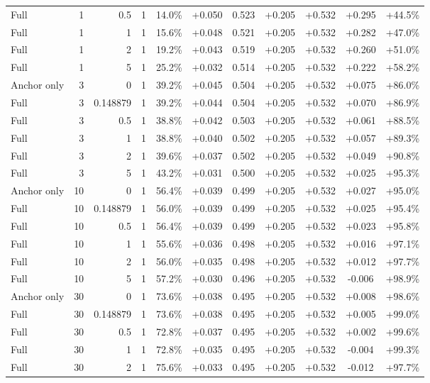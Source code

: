 \begin{table}[htbp]
\begin{tabular}{lrrrccccccc}
Full & 1 & 0.5 & 1 & 14.0\% & +0.050 & 0.523 & +0.205 & +0.532 & +0.295 & +44.5\% \\
Full & 1 & 1 & 1 & 15.6\% & +0.048 & 0.521 & +0.205 & +0.532 & +0.282 & +47.0\% \\
Full & 1 & 2 & 1 & 19.2\% & +0.043 & 0.519 & +0.205 & +0.532 & +0.260 & +51.0\% \\
Full & 1 & 5 & 1 & 25.2\% & +0.032 & 0.514 & +0.205 & +0.532 & +0.222 & +58.2\% \\
Anchor only & 3 & 0 & 1 & 39.2\% & +0.045 & 0.504 & +0.205 & +0.532 & +0.075 & +86.0\% \\
Full & 3 & 0.148879 & 1 & 39.2\% & +0.044 & 0.504 & +0.205 & +0.532 & +0.070 & +86.9\% \\
Full & 3 & 0.5 & 1 & 38.8\% & +0.042 & 0.503 & +0.205 & +0.532 & +0.061 & +88.5\% \\
Full & 3 & 1 & 1 & 38.8\% & +0.040 & 0.502 & +0.205 & +0.532 & +0.057 & +89.3\% \\
Full & 3 & 2 & 1 & 39.6\% & +0.037 & 0.502 & +0.205 & +0.532 & +0.049 & +90.8\% \\
Full & 3 & 5 & 1 & 43.2\% & +0.031 & 0.500 & +0.205 & +0.532 & +0.025 & +95.3\% \\
Anchor only & 10 & 0 & 1 & 56.4\% & +0.039 & 0.499 & +0.205 & +0.532 & +0.027 & +95.0\% \\
Full & 10 & 0.148879 & 1 & 56.0\% & +0.039 & 0.499 & +0.205 & +0.532 & +0.025 & +95.4\% \\
Full & 10 & 0.5 & 1 & 56.4\% & +0.039 & 0.499 & +0.205 & +0.532 & +0.023 & +95.8\% \\
Full & 10 & 1 & 1 & 55.6\% & +0.036 & 0.498 & +0.205 & +0.532 & +0.016 & +97.1\% \\
Full & 10 & 2 & 1 & 56.0\% & +0.035 & 0.498 & +0.205 & +0.532 & +0.012 & +97.7\% \\
Full & 10 & 5 & 1 & 57.2\% & +0.030 & 0.496 & +0.205 & +0.532 & -0.006 & +98.9\% \\
Anchor only & 30 & 0 & 1 & 73.6\% & +0.038 & 0.495 & +0.205 & +0.532 & +0.008 & +98.6\% \\
Full & 30 & 0.148879 & 1 & 73.6\% & +0.038 & 0.495 & +0.205 & +0.532 & +0.005 & +99.0\% \\
Full & 30 & 0.5 & 1 & 72.8\% & +0.037 & 0.495 & +0.205 & +0.532 & +0.002 & +99.6\% \\
Full & 30 & 1 & 1 & 72.8\% & +0.035 & 0.495 & +0.205 & +0.532 & -0.004 & +99.3\% \\
Full & 30 & 2 & 1 & 75.6\% & +0.033 & 0.495 & +0.205 & +0.532 & -0.012 & +97.7\% \\

\end{tabular}
\end{table}
